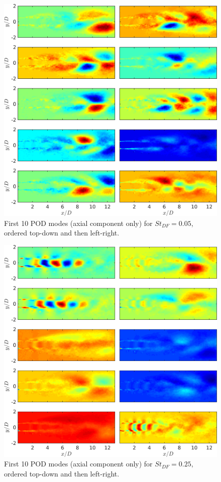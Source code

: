 \begin{figure}
	\centering
	\includegraphics[width=1\linewidth]{Figures/ch4_St005_POD_Modes.png}
	\caption{First 10 POD modes (axial component only) for $St_{DF} = 0.05$, ordered top-down and then left-right.}
	\label{fig:ch4_St005_PODmodes}
\end{figure}
\begin{figure}
	\centering
	\includegraphics[width=1\linewidth]{Figures/ch4_St025_POD_Modes.png}
	\caption{First 10 POD modes (axial component only) for $St_{DF} = 0.25$, ordered top-down and then left-right.}
	\label{fig:ch4_St025_PODmodes}
\end{figure}
